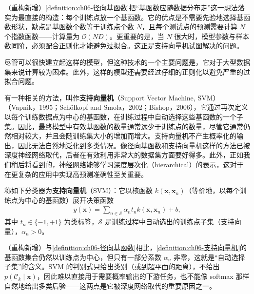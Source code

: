 \documentclass[../../main.tex]{subfiles}
\begin{document}
\begin{remark}（重构新增）\cref{definition:ch06-径向基函数}把“基函数应随数据分布走”这一想法落实为最直接的构造：每个训练点放一个基函数。它的优点是不需要先验地选择基函数形状，缺点是基函数个数等于训练点个数 $N$，且每个测试点的预测需要计算 $N$ 个指数函数——计算量为 $\mathcal{O}(ND)$。更重要的是，当 $N$ 很大时，模型参数与样本数同阶，必须配合正则化才能避免过拟合。这正是支持向量机试图解决的问题。
\end{remark}

尽管可以很快建立起这样的模型，但这种技术的一个主要问题是，它对于大型数据集来说计算较为困难。此外，这样的模型还需要经过仔细的正则化以避免严重的过拟合问题。

有一种相关的方法，叫作\textbf{支持向量机}（Support Vector Machine, SVM）（Vapnik，1995；Schölkopf and Smola，2002；Bishop，2006），它通过再次定义以每个训练数据点为中心的基函数，在训练过程中自动选择这些基函数的一个子集。因此，最终模型中有效基函数的数量通常远少于训练点的数量，尽管它通常仍然相对较大，并且会随训练集大小的增加而增大。支持向量机不产生概率化的输出，因此无法自然地泛化到多类情况。像径向基函数和支持向量机这样的方法已被深度神经网络取代，后者在有效利用非常大的数据集方面要好得多。此外，正如我们稍后将看到的，神经网络能够学习深度层次化（hierarchical）的表示，这对于在更复杂的应用中实现高预测准确性至关重要。

\begin{definition}[支持向量机]\label{definition:ch06-支持向量机}
称如下分类器为\textbf{支持向量机}（SVM）：它以核函数 $k(\boldsymbol{x},\boldsymbol{x}_n)$（等价地，以每个训练点为中心的基函数）展开决策函数
\begin{align}
y(\boldsymbol{x})=\sum_{n\in\mathcal{S}}\alpha_n t_n k(\boldsymbol{x},\boldsymbol{x}_n)+b,
\label{align:ch06-支持向量机}
\end{align}
其中 $t_n\in\{-1,+1\}$ 为类标签，$\mathcal{S}$ 是训练过程中自动选出的训练点子集（支持向量），$\alpha_n>0$。
\end{definition}

\begin{remark}（重构新增）与\cref{definition:ch06-径向基函数}相比，\cref{definition:ch06-支持向量机}的基函数集合仍然以训练点为中心，但只有一部分系数 $\alpha_n$ 非零，这就是“自动选择子集”的含义。SVM 的判别式只给出类别（或到超平面的距离），不给出 $p(\mathcal{C}_k\mid\boldsymbol{x})$，因此难以直接用于需要概率输出的下游任务，也不能像 softmax 那样自然地给出多类后验——这两点是它被深度网络取代的重要原因之一。
\end{remark}
\end{document}
